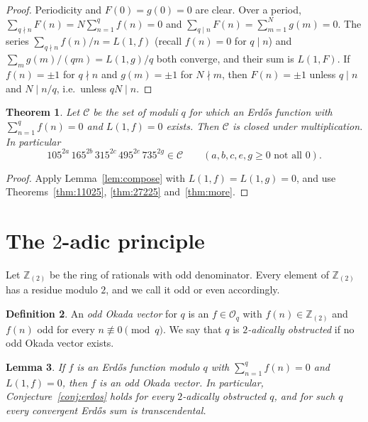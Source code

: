 \documentclass[11pt]{amsart}
\newtheorem{theorem}{Theorem}[section]
\newtheorem{lemma}[theorem]{Lemma}
\theoremstyle{definition}
\newtheorem{definition}[theorem]{Definition}
\theoremstyle{remark}
\newcommand{\Zt}{\mathbb Z_{(2)}}
\newcommand{\Ok}{\mathcal O}
\numberwithin{equation}{section}
\begin{document}
\begin{proof}
Periodicity and $F(0)=g(0)=0$ are clear.
Over a period, $\sum_{q\nmid n}F(n)=N\sum_{n=1}^qf(n)=0$ and $\sum_{q\mid n}F(n)=\sum_{m=1}^Ng(m)=0$.
The series $\sum_{q\nmid n}f(n)/n=L(1,f)$ (recall $f(n)=0$ for $q\mid n$) and $\sum_{m}g(m)/(qm)=L(1,g)/q$ both converge, and their sum is $L(1,F)$.
If $f(n)=\pm1$ for $q\nmid n$ and $g(m)=\pm1$ for $N\nmid m$, then $F(n)=\pm1$ unless $q\mid n$ and $N\mid n/q$, i.e.\ unless $qN\mid n$.
\end{proof}

\begin{theorem}\label{thm:semigroup}
Let $\mathcal C$ be the set of moduli $q$ for which an Erd\H{o}s function with $\sum_{n=1}^qf(n)=0$ and $L(1,f)=0$ exists.
Then $\mathcal C$ is closed under multiplication.
In particular
\[
105^{2a}\,165^{2b}\,315^{2c}\,495^{2e}\,735^{2g}\in\mathcal C\qquad(a,b,c,e,g\ge0\text{ not all }0).
\]
\end{theorem}

\begin{proof}
Apply Lemma~\ref{lem:compose} with $L(1,f)=L(1,g)=0$, and use Theorems~\ref{thm:11025}, \ref{thm:27225} and~\ref{thm:more}.
\end{proof}

\section{\texorpdfstring{The $2$-adic principle}{The 2-adic principle}}\label{sec:twoadic}

Let $\Zt$ be the ring of rationals with odd denominator.
Every element of $\Zt$ has a residue modulo $2$, and we call it odd or even accordingly.

\begin{definition}\label{def:odd}
An \emph{odd Okada vector} for $q$ is an $f\in\Ok_q$ with $f(n)\in\Zt$ and $f(n)$ odd for every $n\not\equiv0\pmod q$.
We say that $q$ is \emph{$2$-adically obstructed} if no odd Okada vector exists.
\end{definition}

\begin{lemma}\label{lem:erdos-odd}
If $f$ is an Erd\H{o}s function modulo $q$ with $\sum_{n=1}^qf(n)=0$ and $L(1,f)=0$, then $f$ is an odd Okada vector.
In particular, Conjecture~\ref{conj:erdos} holds for every $2$-adically obstructed $q$, and for such $q$ every convergent Erd\H{o}s sum is transcendental.
\end{lemma}
\end{document}
